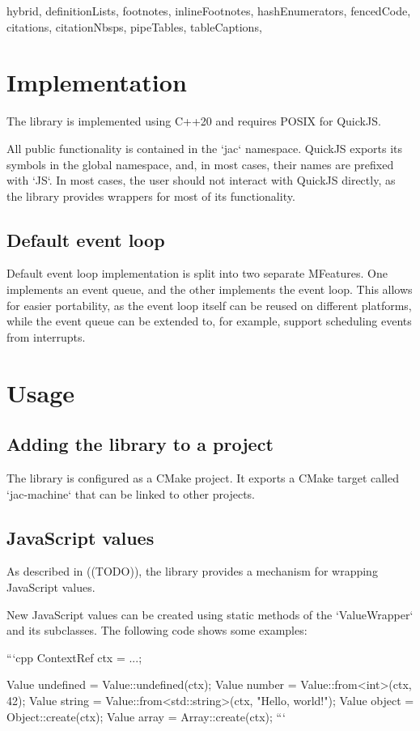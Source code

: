 \begin{markdown*}{%
  hybrid,
  definitionLists,
  footnotes,
  inlineFootnotes,
  hashEnumerators,
  fencedCode,
  citations,
  citationNbsps,
  pipeTables,
  tableCaptions,
}
\section{Implementation}

The library is implemented using C++20 and requires POSIX for QuickJS.

All public functionality is contained in the `jac` namespace. QuickJS exports its symbols in the global namespace, and, in most cases, their names are prefixed with `JS`. In most cases, the user should not interact with QuickJS directly, as the library provides wrappers for most of its functionality.

\subsection{Default event loop}

Default event loop implementation is split into two separate MFeatures. One implements an event queue, and the other implements the event loop. This allows for easier portability, as the event loop itself can be reused on different platforms, while the event queue can be extended to, for example, support scheduling events from interrupts.


\section{Usage}

\subsection{Adding the library to a project}

The library is configured as a CMake project. It exports a CMake target called `jac-machine` that can be linked to other projects.

\subsection{JavaScript values}

As described in ((TODO)), the library provides a mechanism for wrapping JavaScript values.

New JavaScript values can be created using static methods of the `ValueWrapper` and its subclasses. The following code shows some examples:

```cpp
ContextRef ctx = ...;

Value undefined = Value::undefined(ctx);
Value number = Value::from<int>(ctx, 42);
Value string = Value::from<std::string>(ctx, "Hello, world!");
Value object = Object::create(ctx);
Value array = Array::create(ctx);
```


\end{markdown*}
